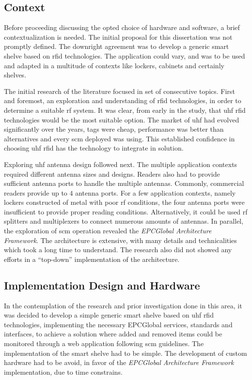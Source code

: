 \subsection{Context}

Before proceeding discussing the opted choice of hardware and software, a brief contextualization is needed.
The initial proposal for this dissertation was not promptly defined. The downright agreement was to develop a generic smart shelve based on \ac{rfid} technologies. The application could vary, and was to be used and adapted in a multitude of contexts like lockers, cabinets and certainly shelves.

The initial research of the literature focused in set of consecutive topics.
First and foremost, an exploration and understanding of \ac{rfid} technologies, in order to determine a suitable \ac{rf} system. It was clear, from early in the study, that \ac{uhf} \ac{rfid} technologies would be the most suitable option. The market of \ac{uhf} had evolved significantly over the years, tags were cheap, performance was better than alternatives and every \ac{scm} deployed was using. This established confidence in choosing \ac{uhf} \ac{rfid} has the technology to integrate in solution.

Exploring \ac{uhf} antenna design followed next. The multiple application contexts required different antenna sizes and designs.
Readers also had to provide sufficient antenna ports to handle the multiple antennas. Commonly, commercial readers provide up to $4$ antenna ports. For a few application contexts, namely lockers constructed of metal with poor \ac{rf} conditions, the four antenna ports were insufficient to provide proper reading conditions. Alternatively, it could be used \ac{rf} splitters and multiplexers to connect numerous amounts of antennas.
In parallel, the exploration of \ac{scm} operation revealed the \emph{EPCGlobal Architecture Framework}. The architecture is extensive, with many details and technicalities which took a long time to understand. The research also did not showed any efforts in a ``top-down'' implementation of the architecture.

\subsection{Implementation Design and Hardware}

In the contemplation of the research and prior investigation done in this area, it was decided to develop a simple generic smart shelve based on \ac{uhf} \ac{rfid} technologies, implementing the necessary EPCGlobal services, standards and interfaces, to achieve a solution where added and removed items could be monitored through a web application following \ac{scm} guidelines.
The implementation of the smart shelve had to be simple. The development of custom hardware had to be avoid, in favor of the \emph{EPCGlobal Architecture Framework} implementation, due to time constrains.

